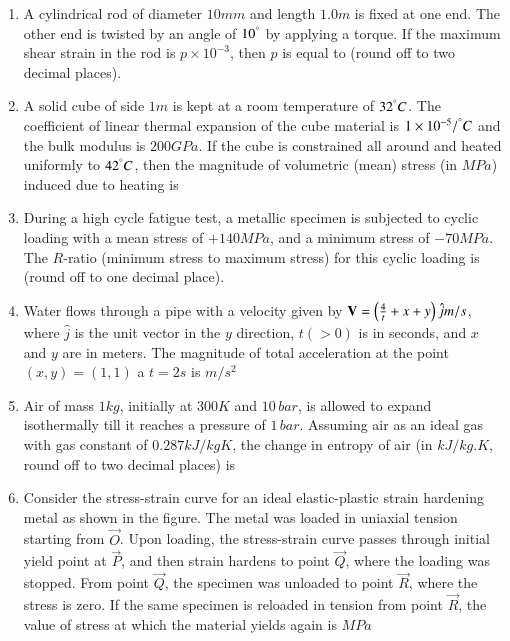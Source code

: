 \documentclass[journal]{IEEEtran}
\begin{document}
\begin{enumerate}
    \item  A cylindrical rod of diameter $10 mm$ and length $1.0 m$ is fixed at one end. The other end is twisted by an angle of $10^\degree$ by applying a torque. If the maximum shear strain in the rod is $p\times10^{-3}$, then $p$ is equal to \underline{\hspace{1cm}} (round off to two decimal places).

    \item A solid cube of side $1 m$ is kept at a room temperature of $32 ^\degree C$. The coefficient of linear thermal expansion of the cube material is $1\times 10^{-5}/{}^{\degree} C$ and the bulk modulus is $200 GPa$. If the cube is constrained all around and heated uniformly to $42 ^\degree C$, then the magnitude of volumetric (mean) stress (in $MPa$) induced due to heating is \underline{\hspace{1cm}}

    \item During a high cycle fatigue test, a metallic specimen is subjected to cyclic loading with a mean stress of $+140 MPa$, and a minimum stress of $-70 MPa$. The $R$-ratio (minimum stress to maximum stress) for this cyclic loading is \underline{\hspace{1cm}} (round off to one decimal place).

    \item Water flows through a pipe with a velocity given by $\mathbf{V} = \left(\frac{4}{t}+x+y\right)\hat{j}m/s$, where $\hat{j}$ is the unit vector in the $y$ direction, $t (> 0)$ is in seconds, and $x$ and $y$ are in meters. The magnitude of total acceleration at the point $(x, y) = (1, 1)$ a $t = 2 s$ is \underline{\hspace{1cm}} $m/s^2$

    \item Air of mass $1 kg$, initially at $300 K$ and $10\,bar$, is allowed to expand isothermally till it reaches a pressure of $1\,bar$. Assuming air as an ideal gas with gas constant of $0.287 kJ/kg K$, the change in entropy of air (in $kJ/kg.K$, round off to two decimal places) is \underline{\hspace{1cm}}

    \item Consider the stress-strain curve for an ideal elastic-plastic strain hardening metal as shown in the figure. The metal was loaded in uniaxial tension starting from $\vec{O}$. Upon loading, the stress-strain curve passes through initial yield point at $\vec{P}$, and then strain hardens to point $\vec{Q}$, where the loading was stopped. From point $\vec{Q}$, the specimen was unloaded to point $\vec{R}$, where the stress is zero. If the same specimen is reloaded in tension from point $\vec{R}$, the value of stress at which the material yields again is \underline{\hspace{1cm}} $MPa$
        \begin{figure}[!ht]
            \centering
            
        \end{figure}


\end{enumerate}
\end{document}
